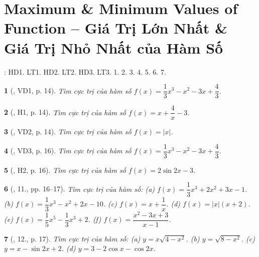 \documentclass{article}
\newtheorem{baitoan}{}
\begin{document}

\section{Maximum \& Minimum Values of Function -- Giá Trị Lớn Nhất \& Giá Trị Nhỏ Nhất của Hàm Số}
\cite[Chap. I, \S2, pp. 15--20]{SGK_Toan_12_CD_tap_1}: HD1. LT1. HD2. LT2. HD3. LT3. 1. 2. 3. 4. 5. 6. 7.

\begin{baitoan}[\cite{SGK_Toan_12_giai_tich_nang_cao}, VD1, p. 14]
	Tìm cực trị của hàm số $f(x) = \dfrac{1}{3}x^3 - x^2 - 3x + \dfrac{4}{3}$.
\end{baitoan}

\begin{baitoan}[\cite{SGK_Toan_12_giai_tich_nang_cao}, H1, p. 14]
	Tìm cực trị của hàm số $f(x) = x + \dfrac{4}{x} - 3$.
\end{baitoan}

\begin{baitoan}[\cite{SGK_Toan_12_giai_tich_nang_cao}, VD2, p. 14]
	Tìm cực trị của hàm số $f(x) = |x|$.
\end{baitoan}

\begin{baitoan}[\cite{SGK_Toan_12_giai_tich_nang_cao}, VD3, p. 16]
	Tìm cực trị của hàm số $f(x) = \dfrac{1}{3}x^3 - x^2 - 3x + \dfrac{4}{3}$.
\end{baitoan}

\begin{baitoan}[\cite{SGK_Toan_12_giai_tich_nang_cao}, H2, p. 16]
	Tìm cực trị của hàm số $f(x) = 2\sin2x - 3$.
\end{baitoan}

\begin{baitoan}[\cite{SGK_Toan_12_giai_tich_nang_cao}, 11., pp. 16--17]
	Tìm cực trị của hàm số: (a) $f(x) = \dfrac{1}{3}x^3 + 2x^2 + 3x - 1$. (b) $f(x) = \dfrac{1}{3}x^3 - x^2 + 2x - 10$. (c) $f(x) = x + \dfrac{1}{x}$. (d) $f(x) = |x|(x + 2)$. (e) $f(x) = \dfrac{1}{5}x^5 - \dfrac{1}{3}x^3 + 2$. (f) $f(x) = \dfrac{x^2 - 3x + 3}{x - 1}$.
\end{baitoan}

\begin{baitoan}[\cite{SGK_Toan_12_giai_tich_nang_cao}, 12., p. 17]
	Tìm cực trị của hàm số: (a) $y = x\sqrt{4 - x^2}$. (b) $y = \sqrt{8 - x^2}$. (c) $y = x - \sin2x + 2$. (d) $y = 3 - 2\cos x - \cos2x$.
\end{baitoan}
\end{document}
